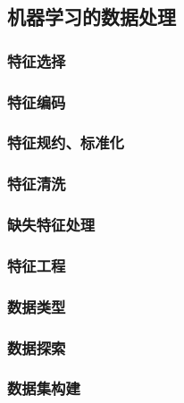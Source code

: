 \subsection{机器学习的数据处理}
\subsubsection{特征选择}
\subsubsection{特征编码}
\subsubsection{特征规约、标准化}
\subsubsection{特征清洗}
\subsubsection{缺失特征处理}
\subsubsection{特征工程}
\subsubsection{数据类型}
\subsubsection{数据探索}
\subsubsection{数据集构建}
